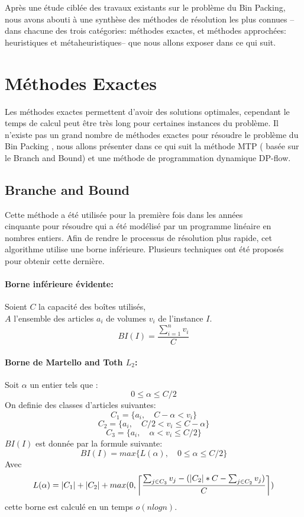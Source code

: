 \documentclass[class=report, crop=false]{standalone}
\DeclarePairedDelimiter\ceil{\lceil}{\rceil}
\begin{document}
    Après une étude ciblée des travaux existants sur le problème du Bin Packing, nous avons abouti à une synthèse des méthodes de résolution les plus connues --dans chacune des trois catégories: méthodes exactes, et méthodes approchées: heuristiques et métaheuristiques-- que nous allons exposer dans ce qui suit. 
    \section{Méthodes Exactes}
    Les méthodes exactes permettent d’avoir des solutions optimales, cependant le temps de calcul peut être très long pour certaines instances du problème. Il n’existe pas un grand nombre de méthodes exactes pour résoudre le problème du Bin Packing , nous allons présenter dans ce qui suit la méthode  MTP ( basée sur le Branch and Bound) et une méthode de programmation dynamique DP-flow.
    \subsection{Branche and Bound}
    Cette méthode a été  utilisée pour la première fois dans les années \\ cinquante pour résoudre qui a été  modélisé par un programme linéaire en nombres entiers.
Afin de rendre le processus de résolution plus rapide, cet algorithme utilise une borne inférieure. Plusieurs techniques ont été proposés pour obtenir cette dernière.
    \paragraph{Borne inférieure évidente:} Soient \(C\) la capacité des boîtes utilisés,\\
     \(A\) l’ensemble des articles \(a_i\) de volumes \(v_i\) de l’instance \(I\).
        \[BI(I)=\frac{\displaystyle\sum_{i=1}^{n} v_i}{C}\]
    \paragraph{Borne de Martello and Toth \(L_2\):}  
    Soit \(\alpha\) un entier tels que :
    \[0 \le \alpha \le C/2\]
    On definie des classes d'articles suivantes: 
    \[C_1 = \{a_i, \quad C-\alpha < v_i\} \]
    \[C_2 = \{a_i, \quad C/2 < v_i \le C-\alpha\} \]
    \[C_3 = \{a_i, \quad \alpha < v_i \le C/2\} \]
    \(BI(I)\)  est donnée par la formule suivante:
    \[BI(I)=max\{L(\alpha),\quad 0 \le \alpha \le C/2\}\]
    Avec
    \[L(\alpha)=|C_1|+|C_2|+max(0, \ceil*{\frac{\sum_{j \in C_3}^{} v_j - (|C_2|*C - \sum_{j \in C_2}^{} v_j) }{C}})\]
    cette borne est calculé en un temps \(o(nlogn)\).
\end{document}
